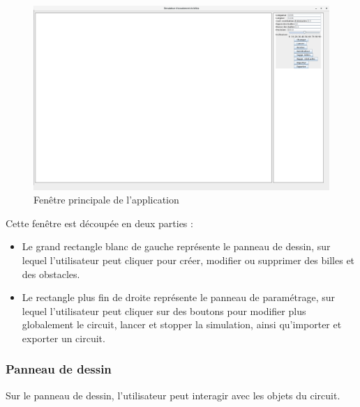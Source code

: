 \documentclass{report}
\begin{document}
\begin{figure}[H]
\centering
\includegraphics[scale=0.25]{main_frame.png}
\caption{Fenêtre principale de l'application}
\end{figure}

Cette fenêtre est découpée en deux parties :
\begin{itemize}
\item Le grand rectangle blanc de gauche représente le panneau de dessin, sur lequel l’utilisateur peut cliquer pour créer, modifier ou supprimer des billes et des obstacles.
\item Le rectangle plus fin de droite représente le panneau de paramétrage, sur lequel l’utilisateur peut cliquer sur des boutons pour modifier plus globalement le circuit, lancer et stopper la simulation, ainsi qu’importer et exporter un circuit.
\end{itemize}

\newpage
\subsubsection{Panneau de dessin}

Sur le panneau de dessin, l’utilisateur peut interagir avec les objets du circuit. \\
\end{document}
